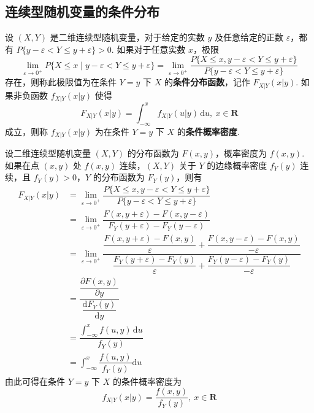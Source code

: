 \subsection{连续型随机变量的条件分布}

\begin{definition}
    设 $(X,Y)$ 是二维连续型随机变量，对于给定的实数 $y$ 及任意给定的正数 $\varepsilon$，都有 $P\{y-\varepsilon < Y \leqslant y+\varepsilon\} > 0$. 如果对于任意实数 $x$，极限
    $$
    \lim_{\varepsilon \to 0^+} P\{X \leqslant x \;|\; y-\varepsilon < Y \leqslant y+\varepsilon\} = \lim_{\varepsilon \to 0^+} \dfrac{P\{X \leqslant x, y-\varepsilon < Y \leqslant y+\varepsilon\}}{P\{y-\varepsilon < Y \leqslant y+\varepsilon\}}
    $$
    存在，则称此极限值为在条件 $Y=y$ 下 $X$ 的\textbf{条件分布函数}，记作 $F_{X|Y}(x|y)$. 如果非负函数 $f_{X|Y}(x|y)$ 使得
    $$
    F_{X|Y}(x|y) = \int_{-\infty}^x f_{X|Y}(u|y) \, \text{d}u,\ x \in \mathbf{R}
    $$
    成立，则称 $f_{X|Y}(x|y)$ 为在条件 $Y=y$ 下 $X$ 的\textbf{条件概率密度}.
\end{definition}

设二维连续型随机变量 $(X,Y)$ 的分布函数为 $F(x,y)$，概率密度为 $f(x,y)$. 如果在点 $(x,y)$ 处 $f(x,y)$ 连续，$(X,Y)$ 关于 $Y$ 的边缘概率密度 $f_{Y}(y)$ 连续，且 $f_{Y}(y)>0$，$Y$ 的分布函数为 $F_{Y}(y)$，则有
$$
\begin{aligned}
    F_{X|Y}(x|y) &= \lim_{\varepsilon \to 0^+} \dfrac{P\{X \leqslant x, y-\varepsilon < Y \leqslant y+\varepsilon\}}{P\{y-\varepsilon < Y \leqslant y+\varepsilon\}} \\[0.7em]
    &= \lim_{\varepsilon \to 0^+} \dfrac{F(x, y+\varepsilon) - F(x, y-\varepsilon)}{F_{Y}(y+\varepsilon) - F_{Y}(y-\varepsilon)} \\[0.7em]
    &= \lim_{\varepsilon \to 0^+} \dfrac{\dfrac{F(x, y+\varepsilon) - F(x,y)}{\varepsilon} + \dfrac{F(x, y-\varepsilon) - F(x,y)}{-\varepsilon}}{\dfrac{F_{Y}(y+\varepsilon) - F_{Y}(y)}{\varepsilon} + \dfrac{F_{Y}(y-\varepsilon) - F_{Y}(y)}{-\varepsilon}} \\
    &= \dfrac{\dfrac{\partial F(x,y)}{\partial y}}{\dfrac{\text{d} F_{Y}(y)}{\text{d}y}} \\[1em]
    &= \dfrac{\displaystyle\int_{-\infty}^x f(u,y) \, \text{d}u}{f_{Y}(y)} \\[1em]
    &= \int_{-\infty}^x \dfrac{f(u,y)}{f_{Y}(y)} \text{d}u
\end{aligned}
$$
由此可得在条件 $Y=y$ 下 $X$ 的条件概率密度为
$$
f_{X|Y}(x|y) = \dfrac{f(x,y)}{f_{Y}(y)},\ x \in \mathbf{R}
$$

